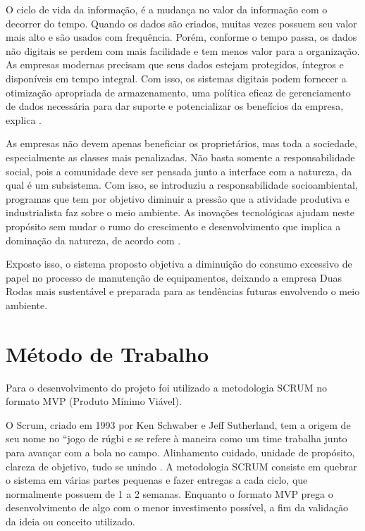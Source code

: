O ciclo de vida da informação, é a mudança no valor da informação com o decorrer do tempo. Quando os dados são criados, muitas vezes possuem seu valor mais alto e são usados com frequência. Porém, conforme o tempo passa, os dados não digitais se perdem com mais facilidade e tem menos valor para a organização.  As empresas modernas precisam que seus dados estejam protegidos, íntegros e disponíveis em tempo integral. Com isso, os sistemas digitais podem fornecer a otimização apropriada de armazenamento, uma política eficaz de gerenciamento de dados necessária para dar suporte e potencializar os benefícios da empresa, explica \cite{somasundaram2009armazenamento}.

As empresas não devem apenas beneficiar os proprietários, mas toda a sociedade, especialmente as classes mais penalizadas. Não basta somente a responsabilidade social, pois a comunidade deve ser pensada junto a interface com a natureza, da qual é um subsistema. Com isso, se introduziu a responsabilidade socioambiental, programas que tem por objetivo diminuir a pressão que a atividade produtiva e industrialista faz sobre o meio ambiente. As inovações tecnológicas ajudam neste propósito sem mudar o rumo do crescimento e desenvolvimento que implica a dominação da natureza, de acordo com \cite{boff2017sustentabilidade}.

Exposto isso, o sistema proposto objetiva a diminuição do consumo excessivo de papel no processo de manutenção de equipamentos, deixando a empresa Duas Rodas mais sustentável e preparada para as tendências futuras envolvendo o meio ambiente.

\section{Método de Trabalho}
Para o desenvolvimento do projeto foi utilizado a metodologia SCRUM no formato MVP (Produto Mínimo Viável).

O Scrum, criado em 1993 por Ken Schwaber e Jeff Sutherland, tem a origem de seu nome no “jogo de rúgbi e se refere à maneira como um time trabalha junto para avançar com a bola no campo. Alinhamento cuidado, unidade de propósito, clareza de objetivo, tudo se unindo \cite{rocha2015metodologia}.
A metodologia SCRUM consiste em quebrar o sistema em várias partes pequenas e fazer entregas a cada ciclo, que normalmente possuem de 1 a 2 semanas.
Enquanto o formato MVP prega o desenvolvimento de algo com o menor investimento possível, a fim da validação da ideia ou conceito utilizado.

